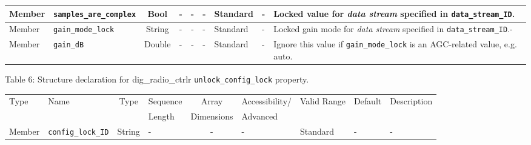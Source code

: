 \documentclass{article}
\def\comp{dig\_radio\_ctrlr}
\begin{document}
\begin{landscape}
\begin{scriptsize}
\begin{longtable}{|p{1.8cm}|p{3.6cm}|c|c|c|p{2cm}|p{1.7cm}|p{1.0cm}|p{7.38cm}|}
			\hline
			Member       & \verb+samples_are_complex+            & Bool   & -       & -          & -              & Standard     & -       & Locked value for \textit{data stream} specified in \verb+data_stream_ID+. \\
			\hline
			Member       & \verb+gain_mode_lock+                 & String & -       & -          & -              & Standard     & -       & Locked gain mode for \textit{data stream} specified in \verb+data_stream_ID+.- \\
			\hline
			Member       & \verb+gain_dB+                        & Double & -       & -          & -              & Standard     & -       & Ignore this value if \verb+gain_mode_lock+ is an AGC-related value, e.g. auto. \\
			\hline
		\end{longtable}
	\end{scriptsize}

	\noindent Table \hypertarget{tab6}{6}: Structure declaration for \comp{} \verb+unlock_config_lock+ property.
	\begin{scriptsize}
		\noindent\begin{longtable}{|p{1.8cm}|p{3.6cm}|c|p{4cm}|c|p{2cm}|p{1.7cm}|p{0.8cm}|p{4.81cm}|}
			\hline
			\rowcolor{blue}
			Type         & Name                                & Type & Sequence & Array      & Accessibility/ & Valid Range  & Default & Description                                                                                                                                                                                                                       \\
			\rowcolor{blue}
			             &                                     &      & Length   & Dimensions & Advanced       &              &         &                                                                                                                                                                                                                             \\
			\hline
			Member       & \verb+config_lock_ID+               & String& -       & -          & -              & Standard     & -       & - \\
			\hline
		\end{longtable}
	\end{scriptsize}


\end{landscape}
\end{document}
